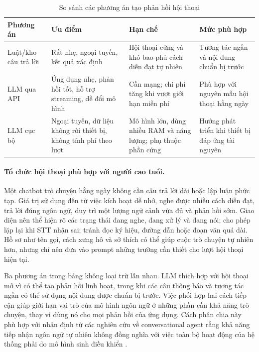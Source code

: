 \begin{table}[H]
\centering
\caption{So sánh các phương án tạo phản hồi hội thoại}
\label{tab:android_chatbot_options}
\small
\begin{tabularx}{\textwidth}{|p{2.6cm}|X|X|X|}
\hline
\textbf{Phương án} & \textbf{Ưu điểm} & \textbf{Hạn chế} & \textbf{Mức phù hợp} \\
\hline
Luật/kho câu trả lời & Rất nhẹ, ngoại tuyến, kết quả xác định & Hội thoại cứng và khó bao phủ cách diễn đạt tự nhiên & Tương tác ngắn và nội dung chuẩn bị trước \\
\hline
LLM qua API & Ứng dụng nhẹ, phản hồi tốt, hỗ trợ streaming, dễ đổi mô hình & Cần mạng; chi phí tăng khi vượt giới hạn miễn phí & Phù hợp với nguyên mẫu hội thoại hằng ngày \\
\hline
LLM cục bộ & Ngoại tuyến, dữ liệu không rời thiết bị, không tính phí theo lượt & Mô hình lớn, dùng nhiều RAM và năng lượng; phụ thuộc phần cứng & Hướng phát triển khi thiết bị đáp ứng tài nguyên \\
\hline
\end{tabularx}
\end{table}

\paragraph{Tổ chức hội thoại phù hợp với người cao tuổi.}
Một chatbot trò chuyện hằng ngày không cần câu trả lời dài hoặc lập luận phức tạp. Giá trị sử dụng đến từ việc kích hoạt dễ nhớ, nghe được nhiều cách diễn đạt, trả lời đúng ngôn ngữ, duy trì một lượng ngữ cảnh vừa đủ và phản hồi sớm. Giao diện nên thể hiện rõ các trạng thái đang nghe, đang xử lý và đang nói; cho phép lặp lại khi STT nhận sai; tránh đọc ký hiệu, đường dẫn hoặc đoạn văn quá dài. Hồ sơ như tên gọi, cách xưng hô và sở thích có thể giúp cuộc trò chuyện tự nhiên hơn, nhưng chỉ nên đưa vào prompt những trường cần thiết cho lượt hội thoại hiện tại.

Ba phương án trong bảng không loại trừ lẫn nhau. LLM thích hợp với hội thoại mở vì có thể tạo phản hồi linh hoạt, trong khi các câu thông báo và tương tác ngắn có thể sử dụng nội dung được chuẩn bị trước. Việc phối hợp hai cách tiếp cận giúp giới hạn vai trò của mô hình ngôn ngữ ở những phần cần khả năng trò chuyện, thay vì dùng nó cho mọi phản hồi của ứng dụng. Cách phân chia này phù hợp với nhận định từ các nghiên cứu về conversational agent rằng khả năng tiếp nhận ngôn ngữ tự nhiên không đồng nghĩa với việc toàn bộ hoạt động của hệ thống phải do mô hình sinh điều khiển .


